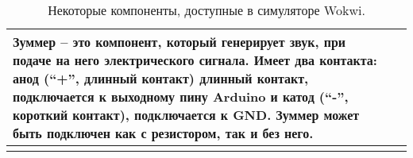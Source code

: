 \documentclass[../sparc.tex]{subfiles}
\begin{document}
\begin{longtable}{|>{
      \centering\arraybackslash
    }p{3cm}|>{
      \centering\arraybackslash}p{8cm}|
  }
{Зуммер -- это компонент, который генерирует звук, при подаче на него
электрического сигнала.  Имеет два контакта: анод (``+'', длинный контакт)
длинный контакт, подключается к выходному пину Arduino и катод (``-'', короткий
контакт), подключается к GND.  Зуммер может быть подключен как с резистором, так
и без него.

} \\  \hline

\caption{Некоторые компоненты, доступные в симуляторе Wokwi.}
\end{longtable}
\end{document}
